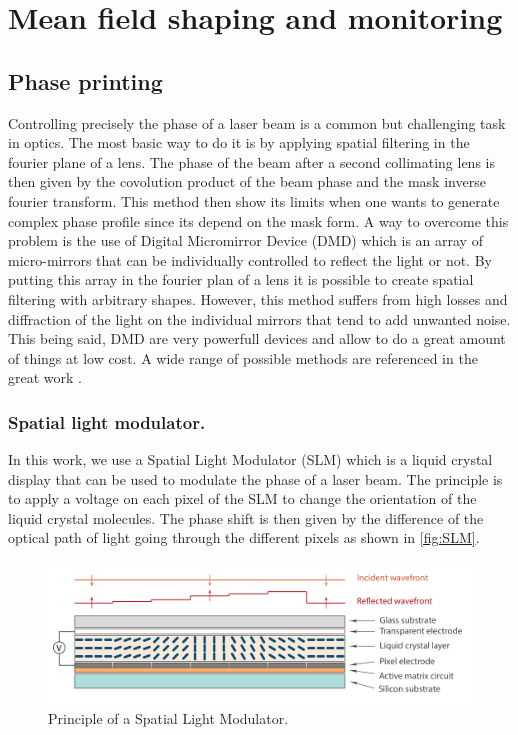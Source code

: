 \graphicspath{{./}{./fig/}{./appendices/fig0/}}

\chapter{Mean field shaping and monitoring}\label{chap:appendices}


\section{Phase printing}

Controlling precisely the phase of a laser beam is a common but challenging task in optics. The most basic way to do it is by applying spatial filtering in the fourier plane of a lens.
The phase of the beam after a second collimating lens is then given by the covolution product of the beam phase and the mask inverse fourier transform. This method then show its limits when one wants to 
generate complex phase profile since its depend on the mask form. A way to overcome this problem is the use of Digital Micromirror Device (DMD) which is an array of micro-mirrors that can be individually controlled to reflect the light or not.
By putting this array in the fourier plan of a lens it is possible to create spatial filtering with arbitrary shapes. However, this method suffers from high losses and diffraction of the light on the individual mirrors that tend to 
add unwanted noise. This being said, DMD are very powerfull devices and allow to do a great amount of things at low cost. A wide range of possible methods are referenced in the great work \cite{wavefront_shapping}. 

\bigskip

\subsection{Spatial light modulator.} In this work, we use a Spatial Light Modulator (SLM) which is a liquid crystal display that can be used to modulate the phase of a laser beam. The principle is to apply a voltage on each pixel of the SLM to change the orientation of the liquid crystal molecules. 
The phase shift is then given by the difference of the optical path of light going through the different pixels as shown in \autoref{fig:SLM}. 

\begin{figure}
    \centering
    \includegraphics[width=1\textwidth]{appendices/fig0/SLMprinciple.png}
    \caption{Principle of a Spatial Light Modulator.}
    \label{fig:SLM}
\end{figure}

